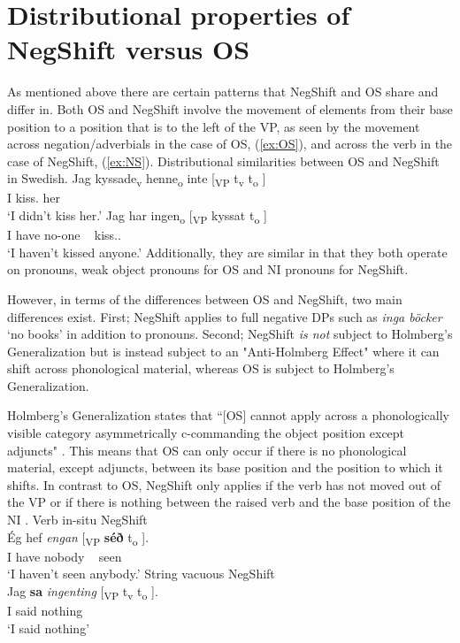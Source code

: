 \documentclass[12pt, letterpaper]{article}
\begin{document}
\section{Distributional properties of NegShift versus OS} \label{sec:DISTRIBUTION}

As mentioned above there are certain patterns that NegShift and OS share and differ in. Both OS and NegShift involve the movement of elements from their base position to a position that is to the left of the VP, as seen by the movement across negation/adverbials in the case of OS, (\ref{ex:OS}), and across the verb in the case of NegShift, (\ref{ex:NS}).
	\ea Distributional similarities between OS and NegShift in Swedish.
		\ea \label{ex:OS}
		\gll Jag kyssade\textsubscript{v} henne\textsubscript{o} inte [\textsubscript{VP} t\textsubscript{v} t\textsubscript{o} ] \\
		I kiss.\Pst{} her \Neg{}\\
		\glt `I didn't kiss her.'
		\ex \label{ex:NS}
		\gll Jag har ingen\textsubscript{o} [\textsubscript{VP} kyssat t\textsubscript{o} ]\\
		I have no-one ~ kiss.\Pst{}.\Ptcp{} \\
		\glt `I haven't kissed anyone.'
		\z 
	\z 
Additionally, they are similar in that they both operate on pronouns, weak object pronouns for OS and NI pronouns for NegShift. 

However, in terms of the differences between OS and NegShift, two main differences exist. First; NegShift applies to full negative DPs such as \textit{inga böcker} `no books' in addition to pronouns. Second; NegShift \emph{is not} subject to Holmberg's Generalization but is instead subject to an "Anti-Holmberg Effect" where it can shift across phonological material, whereas OS is subject to Holmberg's Generalization. 

Holmberg's Generalization states that ``[OS] cannot apply across a phonologically visible category asymmetrically c-commanding the object position except adjuncts" \citep[15]{holmbergRemarksHolmbergGeneralization1999}. This means that OS can only occur if there is no phonological material, except adjuncts, between its base position and the position to which it shifts. In contrast to OS, NegShift only applies if the verb has not moved out of the VP or if there is nothing between the raised verb and the base position of the NI \citep{foxCyclicLinearizationSyntactic2005,engelsScandinavianNegativeIndefinites2012}. 
	\ea 
		\ea Verb in-situ NegShift\\
		{\gll Ég hef \textit{engan} [\textsubscript{VP} \textbf{séð} t\textsubscript{o}	].\\
			I have nobody ~ seen\\}
		\glt `I haven't seen anybody.'
		\ex \label{ex:String} String vacuous NegShift\\
		{\gll Jag \textbf{sa} \textit{ingenting} [\textsubscript{VP} t\textsubscript{v}  t\textsubscript{o}  ].\\
		I said nothing\\}
		\glt `I said nothing'
		\z
	\z 
\end{document}
